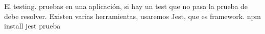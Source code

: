 El testing.
    pruebas en una aplicación, si hay un test que no pasa la prueba de debe resolver.
    Existen varias herramientas, usaremos Jest, que es framework.
    npm install jest 
    prueba